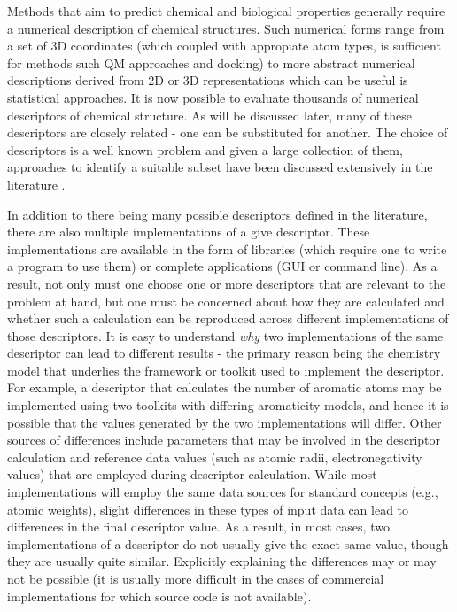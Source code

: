 \documentclass[letterpaper, 12pt]{article}
\begin{document}
Methods that aim to predict chemical and biological properties
generally require a numerical description of chemical structures. Such
numerical forms range from a set of 3D coordinates (which coupled with
appropiate atom types, is sufficient for methods such QM approaches
and docking) to more abstract numerical descriptions derived from 2D
or 3D representations which can be useful is statistical
approaches. It is now possible to evaluate thousands of numerical
descriptors of chemical structure. As will be discussed later, many of
these descriptors are closely related - one can be substituted for
another. The choice of descriptors is a well known problem and given a
large collection of them, approaches to identify a suitable subset
have been discussed extensively in the literature
\cite{Miller:2002aa,Kohavi:1997gf}.

In addition to there being many possible descriptors defined in the
literature, there are also multiple implementations of a give
descriptor. These implementations are available in the form of
libraries (which require one to write a program to use them) or
complete applications (GUI or command line). As a result, not only
must one choose one or more descriptors that are relevant to the
problem at hand, but one must be concerned about how they
are calculated and whether such a calculation can be reproduced across
different implementations of those descriptors. It is easy to
understand \emph{why} two implementations of the same descriptor can
lead to different results - the primary reason being the chemistry
model that underlies the framework or toolkit used to implement the
descriptor. For example, a descriptor that calculates the number of
aromatic atoms may be implemented using two toolkits with differing
aromaticity models, and hence it is possible that the values generated
by the two implementations will differ. Other sources of differences
include parameters that may be involved in the descriptor calculation
and reference data values (such as atomic radii, electronegativity
values) that are employed during descriptor calculation. While most
implementations will employ the same data sources for standard
concepts (e.g., atomic weights), slight differences in these types of
input data can lead to differences in the final descriptor value. As a
result, in most cases, two implementations of a descriptor do not
usually give the exact same value, though they are usually quite
similar. Explicitly explaining the differences may or may not be
possible (it is usually more difficult in the cases of commercial
implementations for which source code is not available).
\end{document}
